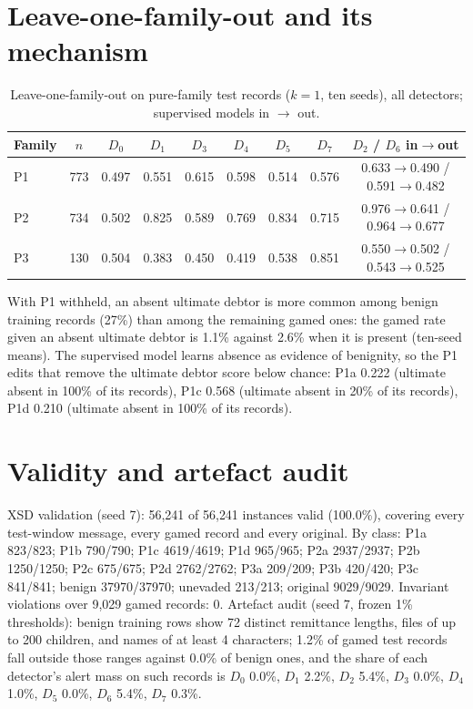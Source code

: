 \documentclass[conference]{IEEEtran}
\begin{document}
\section{Leave-one-family-out and its mechanism}
\begin{table}[t]\caption{Leave-one-family-out on pure-family test records ($k=1$, ten seeds), all detectors; supervised models in $\rightarrow$ out.}\centering\scriptsize\setlength{\tabcolsep}{3pt}
\begin{tabular}{@{}lcccccccc@{}}\toprule
Family & $n$ & $D_0$ & $D_1$ & $D_3$ & $D_4$ & $D_5$ & $D_7$ & $D_2$ / $D_6$ in$\rightarrow$out \\\midrule
P1 & 773 & 0.497 & 0.551 & 0.615 & 0.598 & 0.514 & 0.576 & 0.633$\rightarrow$0.490 / 0.591$\rightarrow$0.482 \\
P2 & 734 & 0.502 & 0.825 & 0.589 & 0.769 & 0.834 & 0.715 & 0.976$\rightarrow$0.641 / 0.964$\rightarrow$0.677 \\
P3 & 130 & 0.504 & 0.383 & 0.450 & 0.419 & 0.538 & 0.851 & 0.550$\rightarrow$0.502 / 0.543$\rightarrow$0.525 \\
\bottomrule\end{tabular}\end{table}
With P1 withheld, an absent ultimate debtor is more common among benign
training records (27\%) than among the remaining gamed
ones: the gamed rate given an absent ultimate debtor is
1.1\% against 2.6\% when it is present (ten-seed
means). The supervised model learns absence as evidence of benignity, so the
P1 edits that remove the ultimate debtor score below chance:
P1a 0.222 (ultimate absent in 100\% of its records), P1c 0.568 (ultimate absent in 20\% of its records), P1d 0.210 (ultimate absent in 100\% of its records).

\section{Validity and artefact audit}
XSD validation (seed 7): 56{,}241 of 56{,}241 instances valid
(100.0\%), covering every test-window message, every gamed record
and every original. By class: P1a 823/823; P1b 790/790; P1c 4619/4619; P1d 965/965; P2a 2937/2937; P2b 1250/1250; P2c 675/675; P2d 2762/2762; P3a 209/209; P3b 420/420; P3c 841/841; benign 37970/37970; unevaded 213/213; original 9029/9029. Invariant violations over
9{,}029 gamed records: 0. Artefact audit (seed 7, frozen
1\% thresholds): benign training rows show 72 distinct remittance
lengths, files of up to 200 children, and names of at least
4 characters; 1.2\% of gamed test records fall
outside those ranges against 0.0\% of benign ones, and the share
of each detector's alert mass on such records is $D_0$ 0.0\%, $D_1$ 2.2\%, $D_2$ 5.4\%, $D_3$ 0.0\%, $D_4$ 1.0\%, $D_5$ 0.0\%, $D_6$ 5.4\%, $D_7$ 0.3\%.
\end{document}
